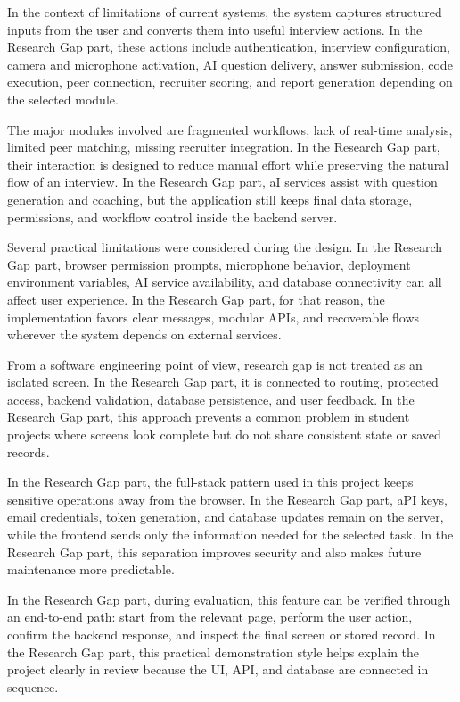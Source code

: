\documentclass[12pt,a4paper]{report}
\begin{document}
In the context of limitations of current systems, the system captures structured inputs from the user and converts them into useful interview actions. In the Research Gap part, these actions include authentication, interview configuration, camera and microphone activation, AI question delivery, answer submission, code execution, peer connection, recruiter scoring, and report generation depending on the selected module.


The major modules involved are fragmented workflows, lack of real-time analysis, limited peer matching, missing recruiter integration. In the Research Gap part, their interaction is designed to reduce manual effort while preserving the natural flow of an interview. In the Research Gap part, aI services assist with question generation and coaching, but the application still keeps final data storage, permissions, and workflow control inside the backend server.


Several practical limitations were considered during the design. In the Research Gap part, browser permission prompts, microphone behavior, deployment environment variables, AI service availability, and database connectivity can all affect user experience. In the Research Gap part, for that reason, the implementation favors clear messages, modular APIs, and recoverable flows wherever the system depends on external services.


From a software engineering point of view, research gap is not treated as an isolated screen. In the Research Gap part, it is connected to routing, protected access, backend validation, database persistence, and user feedback. In the Research Gap part, this approach prevents a common problem in student projects where screens look complete but do not share consistent state or saved records.


In the Research Gap part, the full-stack pattern used in this project keeps sensitive operations away from the browser. In the Research Gap part, aPI keys, email credentials, token generation, and database updates remain on the server, while the frontend sends only the information needed for the selected task. In the Research Gap part, this separation improves security and also makes future maintenance more predictable.


In the Research Gap part, during evaluation, this feature can be verified through an end-to-end path: start from the relevant page, perform the user action, confirm the backend response, and inspect the final screen or stored record. In the Research Gap part, this practical demonstration style helps explain the project clearly in review because the UI, API, and database are connected in sequence.
\end{document}
